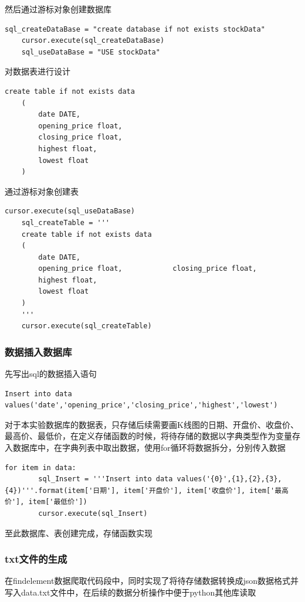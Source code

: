 \documentclass[UTF8,12pt]{article}
\begin{document}
然后通过游标对象创建数据库
\begin{lstlisting}[title=创建数据库,frame=shadowbox]
    sql_createDataBase = "create database if not exists stockData"
    cursor.execute(sql_createDataBase)
    sql_useDataBase = "USE stockData"
\end{lstlisting}

对数据表进行设计
\begin{lstlisting}[title=数据表的设计,frame=shadowbox]
    create table if not exists data
    (
        date DATE,
        opening_price float,
        closing_price float,
        highest float,
        lowest float
    )
\end{lstlisting}

\newpage

通过游标对象创建表
\begin{lstlisting}[title=创建表,frame=shadowbox]
    cursor.execute(sql_useDataBase)
    sql_createTable = '''
    create table if not exists data
    (
        date DATE,
        opening_price float,            closing_price float,
        highest float,
        lowest float
    )
    '''
    cursor.execute(sql_createTable)
\end{lstlisting}
    
\subsubsection{数据插入数据库}

先写出sql的数据插入语句
\begin{lstlisting}[title=sql数据插入语句]
    Insert into data values('date','opening_price','closing_price','highest','lowest')
\end{lstlisting}

对于本实验数据库的数据表，只存储后续需要画K线图的日期、开盘价、收盘价、最高价、最低价，在定义存储函数的时候，将待存储的数据以字典类型作为变量存入数据库中，在字典列表中取出数据，使用for循环将数据拆分，分别传入数据

\begin{lstlisting}[title=数据插入数据库，frame=shadowbox]
    for item in data:
        sql_Insert = '''Insert into data values('{0}',{1},{2},{3},{4})'''.format(item['日期'], item['开盘价'], item['收盘价'], item['最高价'], item['最低价'])
        cursor.execute(sql_Insert)
\end{lstlisting}

至此数据库、表创建完成，存储函数实现

\subsubsection{txt文件的生成}
在findelement数据爬取代码段中，同时实现了将待存储数据转换成json数据格式并写入data.txt文件中，在后续的数据分析操作中便于python其他库读取
\end{document}
